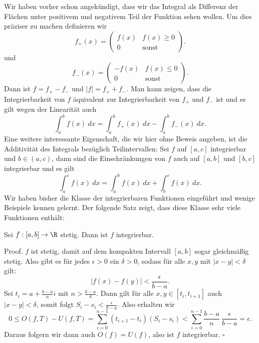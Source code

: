 \documentclass[letterpaper,10pt,english]{jupyterBook}
\begin{document}
Wir haben vorher schon angekündigt, dass wir das Integral als Differenz der Flächen unter positivem und negativem Teil der Funktion sehen wollen. Um dies präziser zu machen definieren wir
\begin{equation*}
 f_+(x) = \begin{pmatrix} f(x) & f(x) \geq 0 \\ 0 & \text{sonst} \end{pmatrix}.
\end{equation*}
und
\begin{equation*}
  f_-(x) = \begin{pmatrix}-f(x) & f(x) \leq 0 \\ 0 & \text{sonst} \end{pmatrix}.
\end{equation*}
Dann ist \(f = f_+ - f_-\) und \(|f|=f_+ + f_-\). Man kann zeigen, dass die Integrierbarkeit von \(f\) äquivalent zur Integrierbarkeit von \(f_+\) und \(f_-\) ist und es gilt wegen der Linearität auch
\begin{equation*}
 \int_a^b f(x)~dx = \int_a^b f_+(x)~dx - \int_a^b f_-(x)~dx.
\end{equation*}
Eine weitere interessante Eigenschaft, die wir hier ohne Beweis angeben, ist die Additivität des Integrals bezüglich Teilintervallen: Sei \(f\) auf \([a,c]\) integrierbar und \(b \in (a,c)\), dann sind die Einschränkungen von \(f\) auch auf \([a,b]\) und \([b,c]\) integrierbar und es gilt
\begin{equation*}
 \int_a^c f(x)~dx =  \int_a^b f(x)~dx + \int_b^c f(x)~dx .
\end{equation*}
Wir haben bisher die Klasse der integrierbaren Funktionen eingeführt und wenige Beispiele kennen gelernt. Der folgende Satz zeigt, dass diese Klasse sehr viele Funktionen enthält:
\label{integration/riemann:theorem-3}
\begin{theorem}{}{}



Sei \(f:[a,b] \rightarrow \R\) stetig. Dann ist \(f\) integrierbar.
\end{theorem}

\begin{emphBox}{}{}
Proof.  \(f\) ist stetig, damit auf dem kompakten Intervall \([a,b]\) sogar gleichmäßig stetig. Also gibt es für jedes \(\epsilon >0 \) ein \(\delta > 0\), sodass für alle \(x,y\) mit \(|x-y| < \delta\) gilt:
\begin{equation*}
 \vert f(x) - f(y) \vert < \frac{\epsilon}{b-a}.
\end{equation*}
Sei \(t_i = a + \frac{b-a}{n} i\) mit \(n > \frac{b-a}\delta\). Dann gilt für alle \(x,y \in [t_i,t_{i+1}]\) auch \(|x-y| < \delta\), somit folgt
\(S_i - s_i < \frac{\epsilon}{b-a}\). Also erhalten wir
\begin{equation*}
 0 \leq O(f,T) - U(f,T) = \sum_{i=0}^{n-1} (t_{i+1}-t_i)(S_i-s_i) < \sum_{i=0}^{n-1} \frac{b-a}{n} ~ \frac{\epsilon}{b-a} = \epsilon.
\end{equation*}
Daraus folgern wir dann auch \(O(f) = U(f)\), also ist \(f\) integrierbar. \(\square\)
\end{emphBox}
\end{document}

